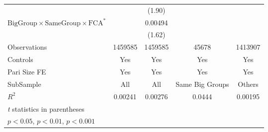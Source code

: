 {\begin{tabular}{l*{4}{c}}
                &                  &   (1.90)         &                  &                  \\
[1em]
$ {\text{BigGroup} } \times {\text{SameGroup} } \times \text{FCA}^* $ &                  &  0.00494         &                  &                  \\
                &                  &   (1.62)         &                  &                  \\
\hline
Observations    &  1459585         &  1459585         &    45678         &  1413907         \\
Controls        &      Yes         &      Yes         &      Yes         &      Yes         \\
Pari Size FE    &      Yes         &      Yes         &      Yes         &      Yes         \\
SubSample       &      All         &      All         &Same Big Groups         &   Others         \\
$ R^2$          &  0.00241         &  0.00276         &   0.0444         &  0.00195         \\
\hline\hline
\multicolumn{5}{l}{\footnotesize \textit{t} statistics in parentheses}\\
\multicolumn{5}{l}{\footnotesize \sym{*} \(p<0.05\), \sym{**} \(p<0.01\), \sym{***} \(p<0.001\)}\\
\end{tabular}
}
